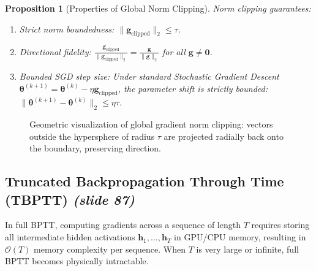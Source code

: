 \documentclass[11pt,a4paper]{article}
\theoremstyle{definition}
\theoremstyle{plain}
\newtheorem{proposition}{Proposition}[section]
\begin{document}
\begin{proposition}[Properties of Global Norm Clipping]
Norm clipping guarantees:
\begin{enumerate}
    \item Strict norm boundedness: $\|\mathbf{g}_{\text{clipped}}\|_2 \le \tau$.
    \item Directional fidelity: $\frac{\mathbf{g}_{\text{clipped}}}{\|\mathbf{g}_{\text{clipped}}\|_2} = \frac{\mathbf{g}}{\|\mathbf{g}\|_2}$ for all $\mathbf{g} \neq \mathbf{0}$.
    \item Bounded SGD step size: Under standard Stochastic Gradient Descent $\boldsymbol{\theta}^{(k+1)} = \boldsymbol{\theta}^{(k)} - \eta \mathbf{g}_{\text{clipped}}$, the parameter shift is strictly bounded: $\|\boldsymbol{\theta}^{(k+1)} - \boldsymbol{\theta}^{(k)}\|_2 \le \eta \tau$.
\end{enumerate}
\end{proposition}

\begin{figure}[htbp]
\centering
{}
\caption{Geometric visualization of global gradient norm clipping: vectors outside the hypersphere of radius $\tau$ are projected radially back onto the boundary, preserving direction.}
\end{figure}

\subsection{Truncated Backpropagation Through Time (TBPTT) \emph{(slide 87)}}
In full BPTT, computing gradients across a sequence of length $T$ requires storing all intermediate hidden activations $\mathbf{h}_1, \dots, \mathbf{h}_T$ in GPU/CPU memory, resulting in $\mathcal{O}(T)$ memory complexity per sequence. When $T$ is very large or infinite, full BPTT becomes physically intractable.
\end{document}
